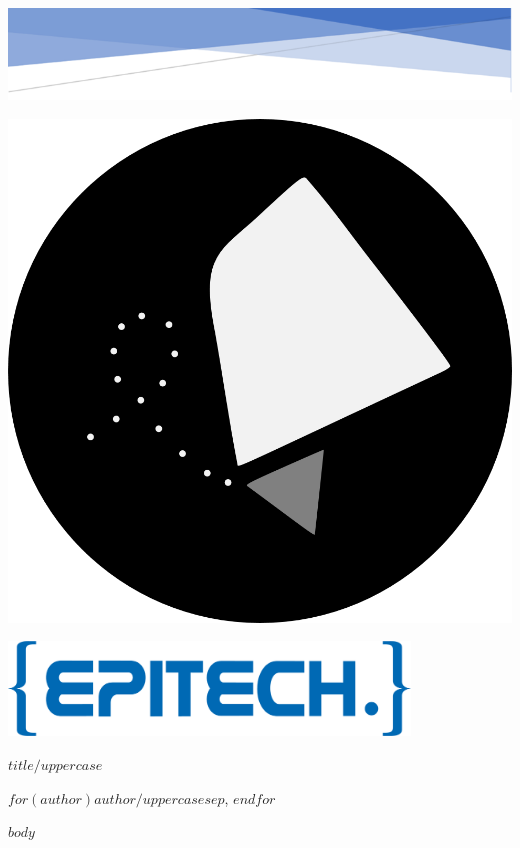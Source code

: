 \documentclass[titlepage]{article}
\begin{document}
\begin{titlepage}
	\noindent
	\includegraphics[width=\textwidth]{resources/header-decoration.png}
	\vspace{1cm}
	\begin{center}
		\includegraphics[scale=0.8]{resources/pizzi-logo.png}
	\end{center}
	\vspace{0.5cm}
	\begin{center}
		\includegraphics[width=0.8\textwidth]{resources/epitech-logo.png}
	\end{center}

	\begin{flushright}
		\huge{\color{epitech-blue}$title/uppercase$\hspace{2cm}}

		\large{$for(author)$$author/uppercase$$sep$, $endfor$\hspace*{2cm}}
	\end{flushright}
	\setcounter{page}{0}
\end{titlepage}

\restoregeometry

$body$
\end{document}

